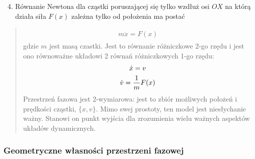 \documentclass[a4paper,12pt,polish]{sphinxmanual}
\begin{document}
\begin{enumerate}
\setcounter{enumi}{3}
\item {} 
Równanie Newtona dla cząstki poruszającej się tylko wzdłuż osi $OX$ na którą działa siła $F(x)$ zależna tylko od położenia  ma postać

\end{enumerate}
\begin{quote}
\label{ch1/chI021:equation-eqn31}\begin{gather}
\begin{split}m \ddot x= F(x)\end{split}\label{ch1/chI021-eqn31}
\end{gather}
gdzie $m$ jest masą czastki. Jest to równanie różniczkowe 2-go rzędu i jest ono  równoważne układowi 2 równań różniczkowych 1-go rzędu:
\label{ch1/chI021:equation-eqn32}\begin{gather}
\begin{split}\dot x = v\end{split}\label{ch1/chI021-eqn32}\\\begin{split}\dot v = \frac{1}{m} F(x)\end{split}\notag
\end{gather}
Przestrzeń fazowa  jest 2-wymiarowa: jest to zbiór możliwych położeń i prędkości cząstki, $\{x, v\}$.
Mimo swej prostoty, ten model jest niesłychanie ważny. Stanowi on punkt wyjścia dla zrozumienia wielu ważnych
aspektów układów dynamicznych.
\end{quote}


\subsubsection{Geometryczne własności przestrzeni fazowej}
\label{ch1/chI021:geometryczne-wlasnosci-przestrzeni-fazowej}
\end{document}
